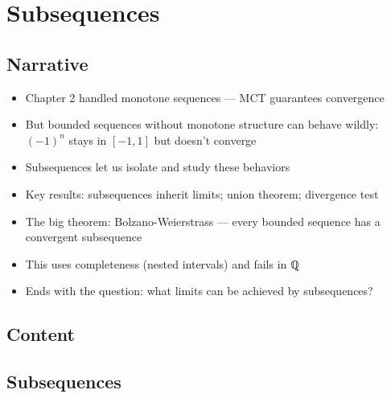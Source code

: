 \documentclass[
  10pt,
  letterpaper,
]{scrbook}
\providecommand{\tightlist}{%
  \setlength{\itemsep}{0pt}\setlength{\parskip}{0pt}}
\begin{document}
\section{Subsequences}\label{subsequences}

\subsection{Narrative}\label{narrative-11}

\begin{itemize}
\tightlist
\item
  Chapter 2 handled monotone sequences --- MCT guarantees convergence
\item
  But bounded sequences without monotone structure can behave wildly:
  \((-1)^n\) stays in \([-1, 1]\) but doesn't converge
\item
  Subsequences let us isolate and study these behaviors
\item
  Key results: subsequences inherit limits; union theorem; divergence
  test
\item
  The big theorem: Bolzano-Weierstrass --- every bounded sequence has a
  convergent subsequence
\item
  This uses completeness (nested intervals) and fails in ℚ
\item
  Ends with the question: what limits can be achieved by subsequences?
\end{itemize}

\subsection{Content}\label{content-11}

\subsection{Subsequences}\label{subsequences-1}
\end{document}
